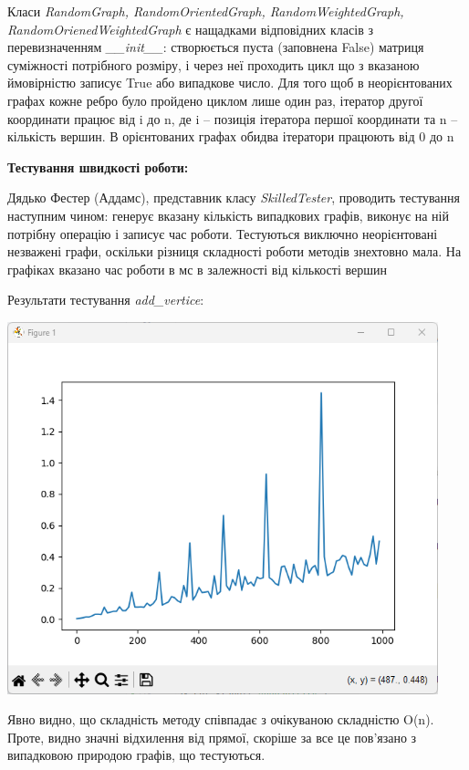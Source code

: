 \documentclass{article}
\begin{document}
Класи \textit{RandomGraph, RandomOrientedGraph, RandomWeightedGraph, RandomOrienedWeightedGraph} є нащадками відповідних класів з перевизначенням \textit{\_\_init\_\_}: створюється пуста (заповнена False) матриця суміжності потрібного розміру, і через неї проходить цикл що з вказаною ймовірністю записує True або випадкове число. Для того щоб в неорієнтованих графах кожне ребро було пройдено циклом лише один раз, ітератор другої координати працює від i до n, де i -- позиція ітератора першої координати та n -- кількість вершин. В орієнтованих графах обидва ітератори працюють від 0 до n



\pagebreak
\textbf{Тестування швидкості роботи:}\\\indent

Дядько Фестер (Аддамс), представник класу \textit{SkilledTester}, проводить тестування наступним чином: генерує вказану кількість випадкових графів, виконує на ній потрібну операцію і записує час роботи. Тестуються виключно неорієнтовані незважені графи, оскільки різниця складності роботи методів знехтовно мала. На графіках вказано час роботи в мс в залежності від кількості вершин\indent
\newpage

Результати тестування \textit{add\_vertice}:\indent
\begin{center}
    \includegraphics[width=125mm]{newvertice}
\end{center}

Явно видно, що складність методу співпадає з очікуваною складністю O(n). Проте, видно значні відхилення від прямої, скоріше за все це пов'язано з випадковою природою графів, що тестуються.\\\indent
\newpage
\end{document}

